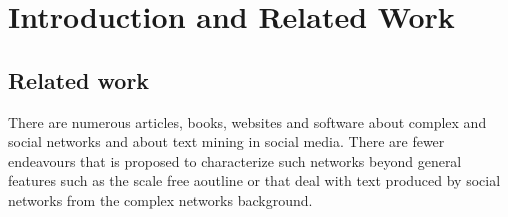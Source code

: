 
\chapter{Introduction and Related Work}\label{ch:int}


\section{Related work}
There are numerous articles, books, websites and software about complex and social networks and about text mining in social media.
There are fewer endeavours that is proposed to characterize such networks beyond general features such as the scale free aoutline or that deal with text produced by social networks from the complex networks background.
